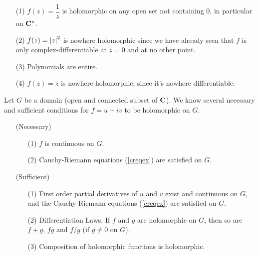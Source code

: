 \medskip

\begin{example}\hfill
\begin{itemize}
\item[(1)] $f(z) = \dfrac{1}{z}$ is holomorphic on any open set not containing $0$, in particular on $\mathbf C^*$.
\item[(2)] $f(z) = \left\lvert z\right\rvert^2$ is nowhere holomorphic since we have already seen that $f$ is only complex-differentiable at $z = 0$ and at no other point.
\item[(3)] Polynomials are entire.
\item[(4)] $f(z) = \overline{z}$ is nowhere holomorphic, since it's nowhere differentiable.
\end{itemize}
\end{example}

\medskip

\begin{discussion}
Let $G$ be a domain (open and connected subset of $\mathbf C$). We know several necessary and sufficient conditions for $f = u + iv$ to be holomorphic on $G$. 
\begin{itemize}[leftmargin = 6em]
\item[(Necessary)]
\begin{itemize}
\item[(1)] $f$ is continuous on $G$.
\item[(2)] Cauchy-Riemann equations (\ref{creqex}) are satisfied on $G$.
\end{itemize}
\item[(Sufficient)]
\begin{itemize}
\item[(1)] First order partial derivatives of $u$ and $v$ exist and continuous on $G$, and the Cauchy-Riemann equations (\ref{creqex}) are satisfied on $G$.
\item[(2)] Differentiation Laws. If $f$ and $g$ are holomorphic on $G$, then so are $f + g,\, fg$ and $f/g$ (if $g \neq 0$ on $G$).
\item[(3)] Composition of holomorphic functions is holomorphic.
\end{itemize}
\end{itemize}
\end{discussion}

\medskip

